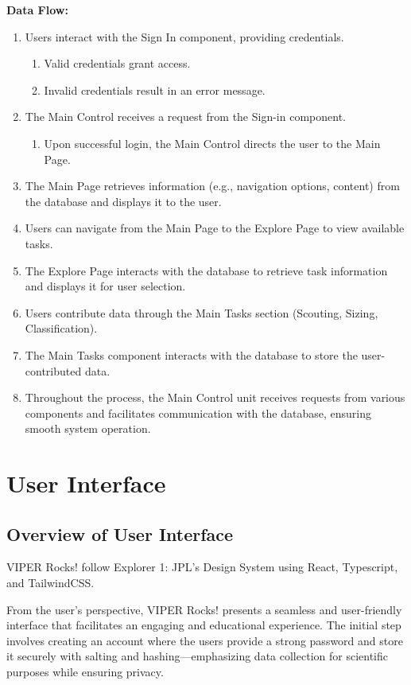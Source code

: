 \documentclass{article}
\begin{document}
\textbf{Data Flow:}
\begin{enumerate}
\item Users interact with the Sign In component, providing credentials.
	\begin{enumerate}[label=(\alph*)]
		\item Valid credentials grant access.
		\item Invalid credentials result in an error message.
	\end{enumerate}
\item The Main Control receives a request from the Sign-in component.
	\begin{enumerate}[label=(\alph*)]
		\item Upon successful login, the Main Control directs the user to the Main Page.
	\end{enumerate}
\item The Main Page retrieves information (e.g., navigation options, content) from the
database and displays it to the user.
\item Users can navigate from the Main Page to the Explore Page to view available tasks.
\item The Explore Page interacts with the database to retrieve task information and displays it
for user selection.
\item Users contribute data through the Main Tasks section (Scouting, Sizing, Classification).
\item The Main Tasks component interacts with the database to store the user-contributed data.
\item Throughout the process, the Main Control unit receives requests from various components and facilitates communication with the database, ensuring smooth system operation.
\end{enumerate}
\section{User Interface}

\subsection{Overview of User Interface}
VIPER Rocks! follow Explorer 1: JPL’s Design System using React, Typescript, and TailwindCSS.

From the user’s perspective, VIPER Rocks! presents a seamless and user-friendly interface that facilitates an engaging and educational experience. The initial step involves creating an account where the users provide a strong password and store it securely with salting and hashing—emphasizing data collection for scientific purposes while ensuring privacy.
\end{document}
